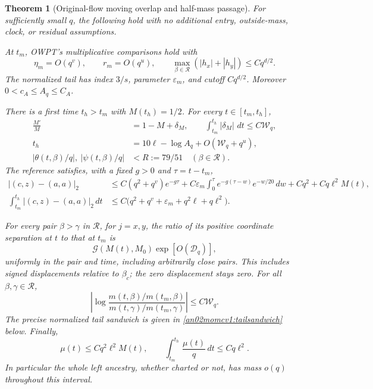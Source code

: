 \documentclass[11pt]{article}
\newtheorem{theorem}{Theorem}[section]
\theoremstyle{remark}\newtheorem{remark}[theorem]{Remark}
\newcommand{\dd}{\,d}
\newcommand{\Rhalf}{\mathcal R}
\newcommand{\eps}{\varepsilon}
\begin{document}
\begin{theorem}[Original-flow moving overlap and half-mass passage]
\label{an02momcv1:main}
For sufficiently small $q$, the following hold with no additional
entry, outside-mass, clock, or residual assumptions.

At $t_m$, OWPT's multiplicative comparisons hold with
\[
 \eta_m=O(q^v),\qquad r_m=O(q^u),\qquad
 \max_{\beta\in\Rhalf}(|h_x|+|h_y|)\le Cq^{d/2}.
\]
The normalized tail has index $3/s$, parameter $\eps_m$, and
cutoff $Cq^{d/2}$. Moreover $0<c_A\le A_q\le C_A$.

There is a first time $t_h>t_m$ with $M(t_h)=1/2$.
For every $t\in[t_m,t_h]$,
\begin{align}
 \frac{M'}M&=1-M+\delta_M,\qquad
 \int_{t_m}^{t_h}|\delta_M|\,\dd t\le C\mathcal W_q,
 \label{an02momcv1:massclaim}\\
 t_h&=10\ell-\log A_q+O(\mathcal W_q+q^u),
 \label{an02momcv1:timeclaim}\\
 |\theta(t,\beta)/q|,\ |\psi(t,\beta)/q|
 &<R:=79/51 \quad(\beta\in\Rhalf).
 \label{an02momcv1:chartclaim}
\end{align}
The reference satisfies, with a fixed $g>0$ and $\tau=t-t_m$,
\begin{align}
 |(c,z)-(a,a)|_2
 &\le C(q^2+q^v)e^{-g\tau}
   +C\eps_m\int_0^\tau e^{-g(\tau-w)}e^{-w/20}\dd w
   +Cq^2+Cq\ell^2M(t), \label{an02momcv1:meanclaim}\\
 \int_{t_m}^{t_h}|(c,z)-(a,a)|_2\dd t
 &\le C\big(q^2+q^v+\eps_m+q^2\ell+q\ell^2\big).
 \label{an02momcv1:meanintegral}
\end{align}

For every pair $\beta>\gamma$ in $\Rhalf$, for $j=x,y$,
the ratio of its positive coordinate separation at $t$ to that at
$t_m$ is
\begin{equation}\label{an02momcv1:pairclaim}
 \mathcal G(M(t),M_0)\exp[O(\mathcal D_q)],
\end{equation}
uniformly in the pair and time, including arbitrarily close pairs.
This includes signed displacements relative to $\beta_c$;
the zero displacement stays zero.
For all $\beta,\gamma\in\Rhalf$,
\begin{equation}\label{an02momcv1:weightclaim}
 \left|\log\frac{m(t,\beta)/m(t_m,\beta)}
                    {m(t,\gamma)/m(t_m,\gamma)}\right|
 \le C\mathcal W_q.
\end{equation}
The precise normalized tail sandwich is given in
\eqref{an02momcv1:tailsandwich} below. Finally,
\begin{equation}\label{an02momcv1:outsideclaim}
 \mu(t)\le Cq^2\ell^2M(t),\qquad
 \int_{t_m}^{t_h}\frac{\mu(t)}q\dd t\le Cq\ell^2.
\end{equation}
In particular the whole left ancestry, whether charted or not,
has mass $o(q)$ throughout this interval.
\end{theorem}
\end{document}
